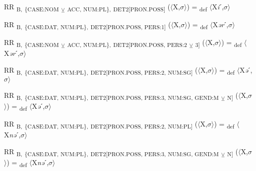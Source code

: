 {\begin{exe}
 RR \textsubscript{B,} \textsubscript{\{CASE:NOM} \textsubscript{${\veebar}$}\textsubscript{ ACC, NUM:PL\},} \textsubscript{DET2[PRON.POSS]} ($\langle$X,$\sigma $$\rangle$) = \textsubscript{def} $\langle$X\textit{i}ˊ,$\sigma $$\rangle$
\end{exe}

\begin{exe}
 RR \textsubscript{B,} \textsubscript{\{CASE:DAT, NUM:PL\},} \textsubscript{DET2[PRON.POSS, PERS:1]} ($\langle$X,$\sigma $$\rangle$) = \textsubscript{def} $\langle$X\textit{ər}ˊ,$\sigma $$\rangle$
\end{exe}

\begin{exe}
 RR \textsubscript{B,} \textsubscript{\{CASE:NOM} \textsubscript{${\veebar}$}\textsubscript{ ACC, NUM:PL\},} \textsubscript{DET2[PRON.POSS, PERS:2} \textsubscript{${\veebar}$}\textsubscript{ 3]} ($\langle$X,$\sigma $$\rangle$) = \textsubscript{def} $\langle$X\textit{ər}ˊ,$\sigma $$\rangle$
\end{exe}

\begin{exe}
 RR \textsubscript{B,} \textsubscript{\{CASE:DAT, NUM:PL\},} \textsubscript{DET2[PRON.POSS, PERS:2, NUM:SG]} ($\langle$X,$\sigma $$\rangle$) = \textsubscript{def} $\langle$X\textit{ə}ˊ,$\sigma $$\rangle$
\end{exe}

\begin{exe}
 RR \textsubscript{B,} \textsubscript{\{CASE:DAT, NUM:PL\},} \textsubscript{DET2[PRON.POSS, PERS:3, NUM:SG, GEND:M} \textsubscript{${\veebar}$}\textsubscript{ N]} ($\langle$X,$\sigma $$\rangle$) = \textsubscript{def} $\langle$X\textit{ə}ˊ,$\sigma $$\rangle$
\end{exe}

\begin{exe}
 RR \textsubscript{B,} \textsubscript{\{CASE:DAT, NUM:PL\},} \textsubscript{DET2[PRON.POSS, PERS:2, NUM:PL]} ($\langle$X,$\sigma $$\rangle$) = \textsubscript{def} $\langle$X\textit{nə}ˊ,$\sigma $$\rangle$
\end{exe}

\begin{exe}
 RR \textsubscript{B,} \textsubscript{\{CASE:DAT, NUM:PL\},} \textsubscript{DET2[PRON.POSS, PERS:3, NUM:SG, GEND:M} \textsubscript{${\veebar}$}\textsubscript{ N]} ($\langle$X,$\sigma $$\rangle$) = \textsubscript{def} $\langle$X\textit{nə}ˊ,$\sigma $$\rangle$
\end{exe}

}
